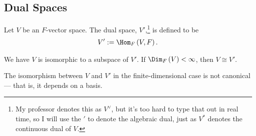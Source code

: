 \documentclass[10pt]{mypackage}
\begin{document}
\subsection{Dual Spaces}%
\begin{definition}
  Let $V$ be an $F$-vector space. The dual space, $V'$,\footnote{My professor denotes this as $V^{\vee}$, but it's too hard to type that out in real time, so I will use the $'$ to denote the algebraic dual, just as $V^{\ast}$ denotes the continuous dual of $V$.} is defined to be
  \begin{align*}
    V':= \Hom_{F}\left(V,F\right).
  \end{align*}
\end{definition}
\begin{theorem}
  We have $V$ is isomorphic to a subspace of $V'$. If $\Dim_{F}\left(V\right) < \infty$, then $V\cong V'$.
\end{theorem}
\begin{remark}
  The isomorphism between $V$ and $V'$ in the finite-dimensional case is not canonical --- that is, it depends on a basis.
\end{remark}
\end{document}
